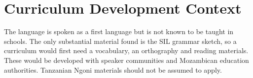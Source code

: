 \documentclass[12pt]{article}
\begin{document}
\section{Curriculum Development Context}
The language is spoken as a first language but is not known to be taught in schools. The only substantial material found is the SIL grammar sketch, so a curriculum would first need a vocabulary, an orthography and reading materials. These would be developed with speaker communities and Mozambican education authorities. Tanzanian Ngoni materials should not be assumed to apply.
\end{document}

